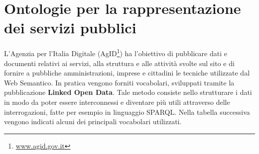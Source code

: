 \documentclass[a4paper,11pt]{article}
\begin{document}
\section{Ontologie per la rappresentazione dei servizi pubblici}
\label{sec:5}
L’Agenzia per l’Italia Digitale (AgID\footnote{\url{www.agid.gov.it}}) ha
l'obiettivo di pubblicare dati e documenti relativi ai servizi, alla struttura e
alle attività svolte sul sito e di fornire a pubbliche amministrazioni, imprese
e cittadini le tecniche utilizzate dal Web Semantico. In pratica vengono forniti
vocabolari, sviluppati tramite la pubblicazione \textbf{Linked Open
Data}\cite{BizHeaBer2009}.
Tale metodo consiste nello strutturare i dati in modo da poter essere interconnessi e diventare più utili attraverso delle interrogazioni, fatte per esempio in linguaggio SPARQL.
Nella tabella successiva vengono indicati alcuni dei principali vocabolari utilizzati.
\end{document}
